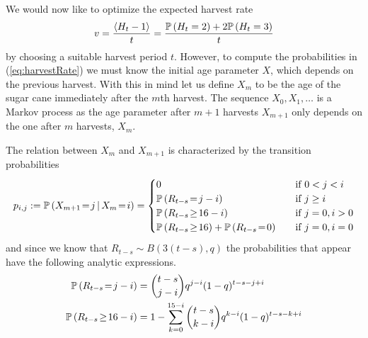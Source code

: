 	We would now like to optimize the expected harvest rate
	\begin{align}\label{eq:harvestRate}
		v = \frac{\langle H_t-1\rangle}{t}
		= \frac{\Prob{H_t=2} + 2\Prob{H_t=3}}{t}
	\end{align}
	by choosing a suitable harvest period $t$. However, to compute the probabilities in
	(\ref{eq:harvestRate}) we must know the initial age parameter $X$, which depends on
	the previous harvest. With this in mind let us define $X_m$ to be the age of the sugar
	cane immediately after the $m$th harvest. The sequence $X_0,X_1,\ldots$ is a Markov
	process as the age parameter after $m+1$ harvests $X_{m+1}$ only depends on the one
	after $m$ harvests, $X_m$.

	The relation between $X_m$ and $X_{m+1}$ is characterized by the transition
	probabilities
	\begin{align}\label{eq:transitionProbability}
		p_{i,j} := \Prob{X_{m+1}\!=\!j \mid X_m\!=\!i}
		= \begin{cases}
			0 \quad&\text{if }0<j<i
			\\\Prob{R_{t-s}\!=\!j-i} \quad&\text{if }j\geq i
			\\\Prob{R_{t-s}\!\geq\!16-i} \quad&\text{if }j=0,i>0
			\\\Prob{R_{t-s}\!\geq\!16}+\Prob{R_{t-s}\!=\!0} \quad&\text{if }j=0,i=0
		\end{cases}
	\end{align}
	and since we know that $R_{t-s}\sim B(3(t-s),q)$ the probabilities that appear have the
	following analytic expressions.
	\begin{align}
		\Prob{R_{t-s}\!=\!j-i}\label{eq:binomialCdf}
		&= {t-s\choose j-i}q^{j-i}(1-q)^{t-s-j+i}
		\\\Prob{R_{t-s}\!\geq\!16-i}\label{eq:binomialCdf}
		&= 1 - \sum_{k=0}^{15-i}{t-s\choose k-i}q^{k-i}(1-q)^{t-s-k+i}
	\end{align}

